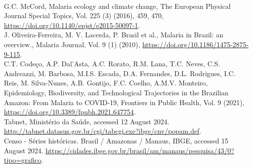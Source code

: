 \documentclass[3p,times]{elsarticle}
\begin{document}
\begin{thebibliography}{00}
\\
 G.C. McCord, Malaria ecology and climate change, The European Physical Journal Special Topics, Vol. 225 (3) (2016), 459, 470, \href{https://doi.org/10.1140/epjst/e2015-50097-1}{https://doi.org/10.1140/epjst/e2015-50097-1}.
\\
 J. Oliveira-Ferreira, M. V. Lacerda, P. Brasil et al., Malaria in Brazil: an overview., Malaria Journal, Vol. 9 (1) (2010), \href{https://doi.org/10.1186/1475-2875-9-115}{https://doi.org/10.1186/1475-2875-9-115}.
\\
 C.T. Codeço, A.P. Dal'Asta, A.C. Rorato, R.M. Lana, T.C. Neves, C.S. Andreazzi, M. Barbosa, M.I.S. Escada, D.A. Fernandes, D.L. Rodrigues, I.C. Reis, M. Silva-Nunes, A.B. Gontijo, F.C. Coelho, A.M.V. Monteiro, Epidemiology, Biodiversity, and Technological Trajectories in the Brazilian Amazon: From Malaria to COVID-19, Frontiers in Public Health, Vol. 9 (2021), \href{https://doi.org/10.3389/fpubh.2021.647754}{https://doi.org/10.3389/fpubh.2021.647754}.
\\
 Tabnet, Ministério da Saúde, accessed 12 August 2024. \href{http://tabnet.datasus.gov.br/cgi/tabcgi.exe?ibge/cnv/popam.def}{http://tabnet.datasus.gov.br/cgi/tabcgi.exe?ibge/cnv/popam.def}.
\\
 Censo - Séries históricas. Brasil / Amazonas / Manaus, IBGE, accessed 15 August 2024. \href{https://cidades.ibge.gov.br/brasil/am/manaus/pesquisa/43/0?tipo=grafico}{https://cidades.ibge.gov.br/brasil/am/manaus/pesquisa/43/0?tipo=grafico}.
\\


\end{thebibliography}
\end{document}

